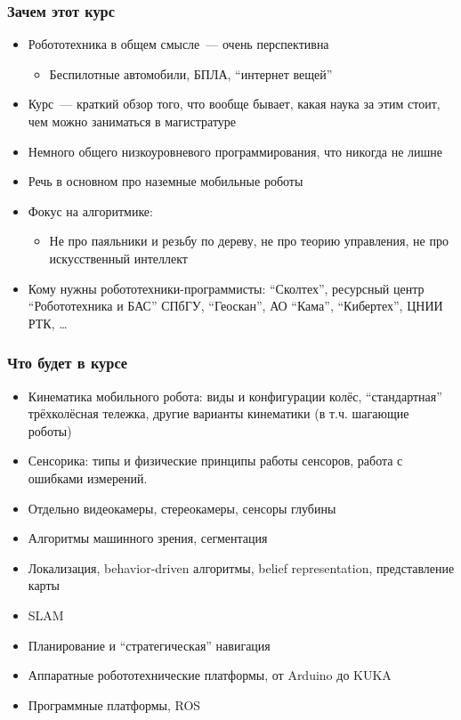 \documentclass{../../slides-style}
\begin{document}
    \begin{frame}
        \frametitle{Зачем этот курс}
        \begin{itemize}
            \item Робототехника в общем смысле~--- очень перспективна
            \begin{itemize}
                \item Беспилотные автомобили, БПЛА, \enquote{интернет вещей}
            \end{itemize}
            \item Курс~--- краткий обзор того, что вообще бывает, какая наука за этим стоит, чем можно заниматься в магистратуре
            \item Немного общего низкоуровневого программирования, что никогда не лишне
            \item Речь в основном про наземные мобильные роботы
            \item Фокус на алгоритмике:
            \begin{itemize}
                \item Не про паяльники и резьбу по дереву, не про теорию управления, не про искусственный интеллект
            \end{itemize}
            \item Кому нужны робототехники-программисты: \enquote{Сколтех}, ресурсный центр \enquote{Робототехника и БАС} СПбГУ, \enquote{Геоскан}, АО \enquote{Кама}, \enquote{Кибертех}, ЦНИИ РТК, \dots
        \end{itemize}
    \end{frame}

    \begin{frame}
        \frametitle{Что будет в курсе}
        \begin{itemize}
            \item Кинематика мобильного робота: виды и конфигурации колёс, \enquote{стандартная} трёхколёсная тележка, другие варианты кинематики (в т.ч. шагающие роботы)
            \item Сенсорика: типы и физические принципы работы сенсоров, работа с ошибками измерений.
            \item Отдельно видеокамеры, стереокамеры, сенсоры глубины
            \item Алгоритмы машинного зрения, сегментация
            \item Локализация, behavior-driven алгоритмы, belief representation, представление карты
            \item SLAM
            \item Планирование и \enquote{стратегическая} навигация
            \item Аппаратные робототехнические платформы, от Arduino до KUKA
            \item Программные платформы, ROS
        \end{itemize}
    \end{frame}
\end{document}
